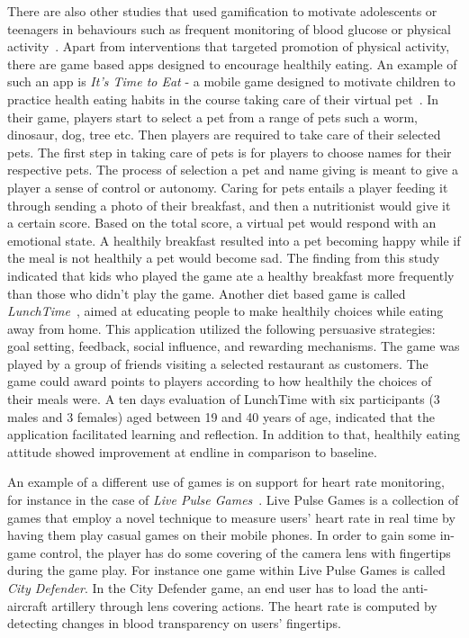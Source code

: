 There are also other studies that used gamification to motivate adolescents or teenagers in behaviours such as frequent monitoring of blood glucose or physical activity~\citep{arteaga2010:persuasive,cafazzo2012:bant}. Apart from interventions that targeted promotion of physical activity, there are game based apps designed to encourage healthily eating. An example of such an app is \emph{It's Time to Eat} - a mobile game designed to motivate children to practice health eating habits in the course taking care of their virtual pet~\citep{pollak2010s}. In their game, players start to select a pet from a range of pets such a worm, dinosaur, dog, tree etc. Then players are required to take care of their selected pets. The first step in taking care of pets  is for players to choose names for their respective pets. The process of selection a pet and name giving is meant to give a player a sense of control or autonomy. Caring for pets entails a player feeding it through sending a photo of their breakfast, and then a nutritionist would give it a certain score. Based on the total score, a virtual pet would respond with an emotional state. A healthily breakfast resulted into a pet becoming happy while if the meal is not healthily a pet would become sad. The finding from this study indicated that kids who played the game ate a healthy breakfast more frequently than those who didn't play the game. Another diet based game is called \emph{LunchTime}~\citep{orji2013lunchtime}, aimed at educating people to make healthily choices while eating away from home. This application utilized the following persuasive strategies: goal setting, feedback, social influence, and rewarding mechanisms. The game was played by a group of friends visiting a selected restaurant as customers. The game could award points to players according to how healthily the choices of their meals were. A ten days evaluation  of LunchTime with six participants (3 males and 3 females) aged between 19 and 40 years of age, indicated that the application facilitated learning and reflection. In addition to that, healthily eating attitude showed improvement at endline in comparison to baseline. 

An example  of a different use of games is on support for heart rate monitoring, for instance in the case of \emph{Live Pulse Games}~\citep{han2014designing,han2015balancing}. Live Pulse Games is a collection of games that employ a novel technique to measure users' heart rate in real time by having them play casual games on their mobile phones. In order to gain some in-game control, the player has do some covering of the camera lens with fingertips during the game play. For instance one game within Live Pulse Games is called \emph{City Defender}. In the City Defender game, an end user has to load the anti-aircraft artillery through lens covering actions. The heart rate is computed by detecting changes  in  blood transparency on users’ fingertips.
 
